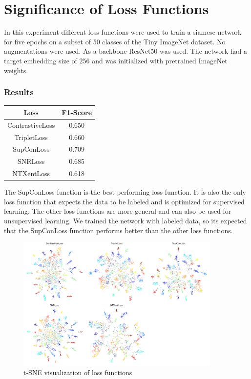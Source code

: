 \documentclass[12pt,a4paper]{report}
\begin{document}
\newpage

\section{Significance of Loss Functions}

In this experiment different loss functions were used to train a siamese network for five epochs on a subset of 50 classes of the Tiny ImageNet dataset.
No augmentations were used.
As a backbone ResNet50 was used.
The network had a target embedding size of 256 and was initialized with pretrained ImageNet weights.


\subsubsection*{Results}
\begin{table}
	\begin{tabular}{ | c | c | }
		\hline
		Loss & F1-Score \\ 
		\hline
		ContrastiveLoss & 0.650 \\ 
		\hline
		TripletLoss & 0.660 \\ 
		\hline
		SupConLoss & 0.709 \\ 
		\hline
		SNRLoss & 0.685 \\ 
		\hline
		NTXentLoss & 0.618 \\ 
		\hline
	\end{tabular}
\end{table} 

The SupConLoss function is the best performing loss function.
It is also the only loss function that expects the data to be labeled and is optimized for supervised learning.
The other loss functions are more general and can also be used for unsupervised learning.
We trained the network with labeled data, so its expected that the SupConLoss function performs better than the other loss functions.

\vspace{0.5cm}

\begin{figure}[h]
	\centering
	\includegraphics[width=0.9\textwidth]{../plots/losses.png}
	\caption{t-SNE visualization of loss functions}
\end{figure}
\end{document}
